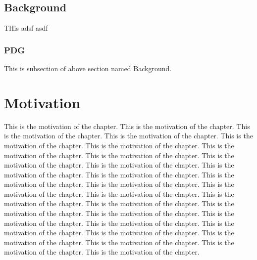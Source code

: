 \documentclass{nithreport}
\begin{document}
\section{Background}
THis adsf asdf

\subsection{PDG}
This is subsection of above section named Background.

\chapter{Motivation}
This is the motivation of the chapter. This is the motivation of the chapter. This is the motivation of the chapter. This is the motivation of the chapter. This is the motivation of the chapter. This is the motivation of the chapter. This is the motivation of the chapter. This is the motivation of the chapter. This is the motivation of the chapter. This is the motivation of the chapter. This is the motivation of the chapter. This is the motivation of the chapter. This is the motivation of the chapter. This is the motivation of the chapter. This is the motivation of the chapter. This is the motivation of the chapter. This is the motivation of the chapter. This is the motivation of the chapter. This is the motivation of the chapter. This is the motivation of the chapter. This is the motivation of the chapter. This is the motivation of the chapter. This is the motivation of the chapter. This is the motivation of the chapter. This is the motivation of the chapter. This is the motivation of the chapter. This is the motivation of the chapter. This is the motivation of the chapter. 



\end{document}
